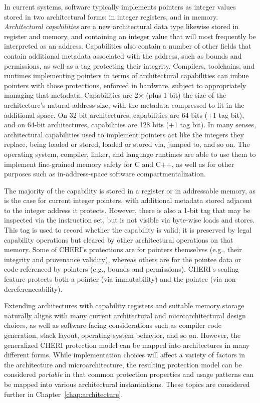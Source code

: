 In current systems, software typically implements pointers as integer values
stored in two architectural forms: in integer registers, and in memory.
\textit{Architectural capabilities} are a new architectural data type likewise
stored in register and memory, and containing an integer value that will most
frequently be interpreted as an address.
Capabilities also contain a number of other fields that contain additional
metadata associated with the address, such as bounds and permissions, as well
as a tag protecting their integrity.
Compilers, toolchains, and runtimes implementing pointers in terms of
architectural capabilities can imbue pointers with those protections, enforced
in hardware, subject to appropriately managing that metadata.
Capabilities are 2$\times$ (plus 1 bit) the size of the architecture's
natural address size, with the metadata compressed to fit in the additional
space.
On 32-bit architectures, capabilities are 64 bits ($+$1 tag bit), and on
64-bit architectures, capabilities are 128 bits ($+$1 tag bit).
In many senses, architectural capabilities used to implement pointers act like
the integers they replace, being loaded or stored, loaded or stored via,
jumped to, and so on.
The operating system, compiler, linker, and language runtimes are able to use
them to implement fine-grained memory safety for C and C++, as well as for
other purposes such as in-address-space software compartmentalization.

The majority of the capability is stored in a register or in
addressable memory, as is the case
for current integer pointers, with additional metadata stored adjacent to the
integer address it protects.
However, there is also a 1-bit tag that may be
inspected via the instruction set, but is not visible via byte-wise loads and
stores.
This tag is used to record whether the capability is valid; it is
preserved by legal capability operations but cleared by other architectural
operations on that memory.
%
Some of CHERI's protections are for pointers themselves (e.g., their integrity
and provenance validity), whereas others are for the pointee data or code
referenced by pointers (e.g., bounds and permissions).
CHERI's sealing feature protects both a pointer (via immutability) and the
pointee (via non-dereferenceability).

Extending architectures with capability registers and suitable memory storage
naturally aligns with many current architectural and microarchitectural design
choices, as well as software-facing considerations such as compiler code
generation, stack layout, operating-system behavior, and so on.
However, the generalized CHERI protection model can be mapped into
architectures in many different forms.
While implementation choices will affect a variety of factors in the
architecture and microarchitecture, the resulting protection model can be
considered \textit{portable} in that common protection properties and usage
patterns can be mapped into various architectural instantiations.
These topics are considered further in Chapter~\ref{chap:architecture}.

